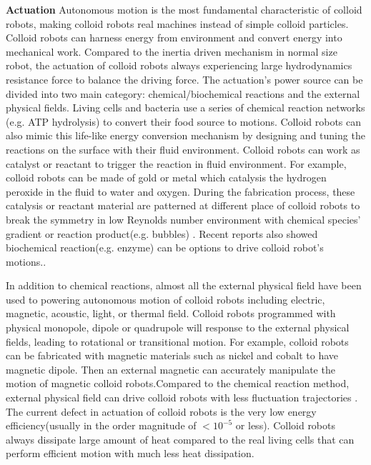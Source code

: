\textbf{Actuation} Autonomous motion is the most fundamental characteristic of colloid robots, making colloid robots real machines instead of simple colloid particles. Colloid robots can harness energy from environment and convert energy into mechanical work. Compared to the inertia driven mechanism in normal size robot, the actuation of colloid robots always experiencing large hydrodynamics resistance force to balance the driving force. The actuation's power source can be divided into two main category: chemical/biochemical reactions and the external physical fields. Living cells and bacteria use a series of  chemical reaction networks (e.g. ATP hydrolysis) to convert their food source to motions. Colloid robots can also mimic this life-like energy conversion mechanism by designing and tuning the reactions on the surface with their fluid environment. Colloid robots can work as catalyst or reactant to trigger the reaction in fluid environment. For example,  colloid robots can be made of gold or metal  which catalysis the hydrogen peroxide in the fluid to water and oxygen. During the fabrication process, these catalysis or reactant material are patterned at different place of colloid robots to break the symmetry in low Reynolds number environment with chemical species' gradient or reaction product(e.g. bubbles) \cite{velegol2016origins,shklyaev2016harnessing,parmar2018micro}. Recent reports also showed biochemical reaction(e.g. enzyme) can be options to drive colloid robot's motions.\cite{zhao2018substrate,somasundar2019positive}.

In addition to  chemical reactions, almost all the external physical field have been used to powering autonomous motion of colloid robots including electric\cite{lee2019directed}, magnetic\cite{zhang2009artificial}, acoustic\cite{sabrina2018shape}, light\cite{dai2016programmable}, or thermal field\cite{lozano2016phototaxis}.  Colloid robots programmed with physical monopole, dipole or quadrupole will response to the external physical fields, leading to rotational or transitional motion. For example, colloid robots can be fabricated with magnetic materials such as nickel and cobalt to have magnetic dipole. Then an external magnetic can accurately manipulate the motion of magnetic colloid robots.Compared to the  chemical reaction method, external physical field can drive colloid robots with less fluctuation trajectories  \cite{han2018engineering,ren2018two}. 
The current defect in actuation of colloid robots is the very low energy efficiency(usually in the order magnitude of $<10^{-5}$ or less). Colloid robots always dissipate large amount of heat\cite{wang2013understanding} compared to the real living cells that can perform efficient motion with much less heat dissipation.

